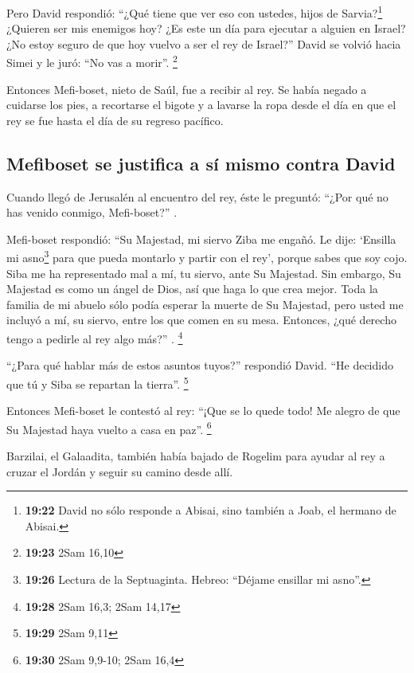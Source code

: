  Pero David respondió: ``¿Qué tiene que ver eso con
ustedes, hijos de Sarvia?\footnote{\textbf{19:22} David no sólo responde
  a Abisai, sino también a Joab, el hermano de Abisai.} ¿Quieren ser mis
enemigos hoy? ¿Es este un día para ejecutar a alguien en Israel? ¿No
estoy seguro de que hoy vuelvo a ser el rey de Israel?'' 
David se volvió hacia Simei y le juró: ``No vas a morir''. \footnote{\textbf{19:23}
  2Sam 16,10}

 Entonces Mefi-boset, nieto de Saúl, fue a recibir al
rey. Se había negado a cuidarse los pies, a recortarse el bigote y a
lavarse la ropa desde el día en que el rey se fue hasta el día de su
regreso pacífico.

\hypertarget{mefiboset-se-justifica-a-suxed-mismo-contra-david}{%
\subsection{Mefiboset se justifica a sí mismo contra
David}\label{mefiboset-se-justifica-a-suxed-mismo-contra-david}}

 Cuando llegó de Jerusalén al encuentro del rey, éste le
preguntó: ``¿Por qué no has venido conmigo, Mefi-boset?'' .

 Mefi-boset respondió: ``Su Majestad, mi siervo Ziba me
engañó. Le dije: `Ensilla mi asno\footnote{\textbf{19:26} Lectura de la
  Septuaginta. Hebreo: ``Déjame ensillar mi asno''.} para que pueda
montarlo y partir con el rey', porque sabes que soy cojo.
 Siba me ha representado mal a mí, tu siervo, ante Su
Majestad. Sin embargo, Su Majestad es como un ángel de Dios, así que
haga lo que crea mejor.  Toda la familia de mi abuelo
sólo podía esperar la muerte de Su Majestad, pero usted me incluyó a mí,
su siervo, entre los que comen en su mesa. Entonces, ¿qué derecho tengo
a pedirle al rey algo más?'' . \footnote{\textbf{19:28} 2Sam 16,3; 2Sam
  14,17}

 ``¿Para qué hablar más de estos asuntos tuyos?''
respondió David. ``He decidido que tú y Siba se repartan la tierra''.
\footnote{\textbf{19:29} 2Sam 9,11}

 Entonces Mefi-boset le contestó al rey: ``¡Que se lo
quede todo! Me alegro de que Su Majestad haya vuelto a casa en paz''.
\footnote{\textbf{19:30} 2Sam 9,9-10; 2Sam 16,4}

 Barzilai, el Galaadita, también había bajado de Rogelim
para ayudar al rey a cruzar el Jordán y seguir su camino desde allí.

